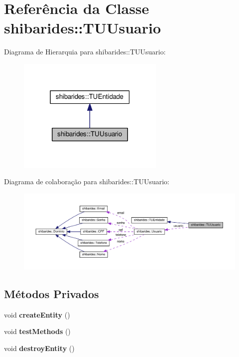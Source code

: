 \hypertarget{classshibarides_1_1TUUsuario}{}\section{Referência da Classe shibarides\+:\+:T\+U\+Usuario}
\label{classshibarides_1_1TUUsuario}


Diagrama de Hierarquia para shibarides\+:\+:T\+U\+Usuario\+:\nopagebreak
\begin{figure}[H]
\begin{center}
\leavevmode
\includegraphics[width=199pt]{classshibarides_1_1TUUsuario__inherit__graph}
\end{center}
\end{figure}


Diagrama de colaboração para shibarides\+:\+:T\+U\+Usuario\+:
\nopagebreak
\begin{figure}[H]
\begin{center}
\leavevmode
\includegraphics[width=350pt]{classshibarides_1_1TUUsuario__coll__graph}
\end{center}
\end{figure}
\subsection*{Métodos Privados}
\begin{DoxyCompactItemize}
\item 
void {\bfseries create\+Entity} ()\hypertarget{classshibarides_1_1TUUsuario_a3163f75cfa01287d5a67d6096b54d19e}{}\label{classshibarides_1_1TUUsuario_a3163f75cfa01287d5a67d6096b54d19e}

\item 
void {\bfseries test\+Methods} ()\hypertarget{classshibarides_1_1TUUsuario_a621c78831d38b25b8c20635926dd76ba}{}\label{classshibarides_1_1TUUsuario_a621c78831d38b25b8c20635926dd76ba}

\item 
void {\bfseries destroy\+Entity} ()\hypertarget{classshibarides_1_1TUUsuario_a7b61c9c8c874171c0947c4a1f046fe31}{}\label{classshibarides_1_1TUUsuario_a7b61c9c8c874171c0947c4a1f046fe31}

\end{DoxyCompactItemize}
